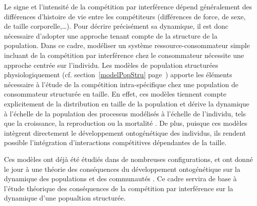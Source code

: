 Le signe et l'intensité de la compétition par interférence dépend généralement
des différences d'histoire de vie entre les compétiteurs (différences de force,
de sexe, de taille corporelle,\ldots). Pour décrire précisément sa dynamique, il
est donc nécessaire d'adopter une approche tenant compte de la structure de la
population. Dans ce cadre, modéliser un système ressource-consommateur simple
incluant de la compétition par interférence chez le consommateur nécessite une
approche centrée sur l'individu. Les modèles de population structurées physiologiquement (cf.
section~\ref{modelPopStru} page~\pageref{modelPopStru}) apporte les éléments
nécessaire à l'étude de la compétition intra-spécifique chez une population de
consommateur structurée en taille. En effet, ces modèles tiennent compte
explicitement de la distribution en taille de la population et dérive la
dynamique à l'échelle de la population des processus modélisés à l'échelle de
l'individu, tels que la croissance, la reproduction ou la mortalité
\autocites{kooijman1984a, metz1986a, de-roos1997a}. De plus, puisque ces modèles
intègrent directement le développement ontogénétique des individus, ils rendent
possible l'intégration d'interactions compétitives dépendantes de la taille.

Ces modèles ont déjà été
étudiés dans de nombreuses configurations, et ont donné le jour à une théorie
des conséquences du développement ontogénétique sur la dynamique des populations
et des communautés \autocites{de-roos2012a}. Ce cadre servira de base
à l'étude théorique des conséquences de la compétition par interférence sur la
dynamique d'une popualtion structurée. 
